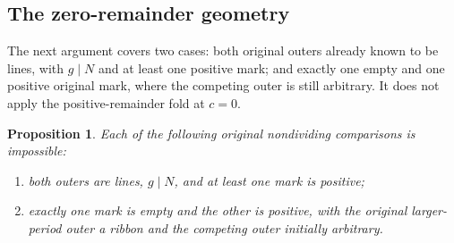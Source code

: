 \documentclass[11pt,a4paper]{amsart}
\numberwithin{equation}{section}
\theoremstyle{plain}
\newtheorem{proposition}[theorem]{Proposition}
\theoremstyle{definition}
\begin{document}
\subsection{The zero-remainder geometry}

The next argument covers two cases: both original outers already known to
be lines, with \(g\mid N\) and at least one positive mark; and exactly one
empty and one positive original mark, where the competing outer is still
arbitrary.  It does not apply the positive-remainder fold at \(c=0\).

\begin{proposition}
\label{prop:zero-remainder}
Each of the following original nondividing comparisons is impossible:
\begin{enumerate}
\item both outers are lines, \(g\mid N\), and at least one mark is positive;
\item exactly one mark is empty and the other is positive, with the original
larger-period outer a ribbon and the competing outer initially arbitrary.
\end{enumerate}
\end{proposition}
\end{document}
